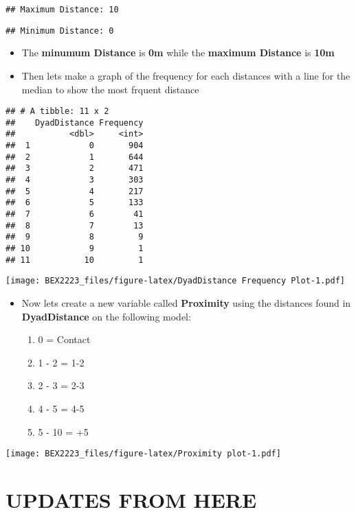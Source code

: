 \documentclass[
]{article}
\providecommand{\tightlist}{%
  \setlength{\itemsep}{0pt}\setlength{\parskip}{0pt}}
\begin{document}
\begin{verbatim}
## Maximum Distance: 10
\end{verbatim}

\begin{verbatim}
## Minimum Distance: 0
\end{verbatim}

\begin{itemize}
\tightlist
\item
  The \textbf{minumum Distance} is \textbf{0m} while the \textbf{maximum
  Distance} is \textbf{10m}
\item
  Then lets make a graph of the frequency for each distances with a line
  for the median to show the most frquent distance
\end{itemize}

\begin{verbatim}
## # A tibble: 11 x 2
##    DyadDistance Frequency
##           <dbl>     <int>
##  1            0       904
##  2            1       644
##  3            2       471
##  4            3       303
##  5            4       217
##  6            5       133
##  7            6        41
##  8            7        13
##  9            8         9
## 10            9         1
## 11           10         1
\end{verbatim}

\texttt{[image: BEX2223\_files/figure-latex/DyadDistance Frequency Plot-1.pdf]}

\begin{itemize}
\tightlist
\item
  Now lets create a new variable called \textbf{Proximity} using the
  distances found in \textbf{DyadDistance} on the following model:

  \begin{enumerate}
  \def\labelenumi{\alph{enumi}.}
  \tightlist
  \item
    0 = Contact
  \item
    1 - 2 = 1-2
  \item
    2 - 3 = 2-3
  \item
    4 - 5 = 4-5
  \item
    5 - 10 = +5
  \end{enumerate}
\end{itemize}

\texttt{[image: BEX2223\_files/figure-latex/Proximity plot-1.pdf]}

\hypertarget{updates-from-here}{%
\section{UPDATES FROM HERE}\label{updates-from-here}}
\end{document}
